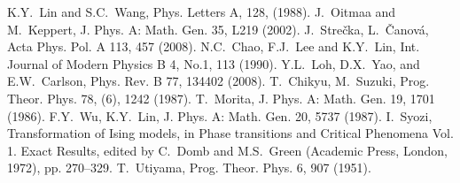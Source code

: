 \documentclass[utf8,12pt]{jetp}
\begin{document}
\begin{references}
 K.Y.~Lin and S.C.~Wang, Phys. Letters A, 128, (1988).
 J.~Oitmaa and M.~Keppert, J. Phys. A: Math. Gen. 35, L219 (2002).
 J.~Strečka, L.~Čanová, Acta Phys. Pol. A 113, 457 (2008). 
 N.C.~Chao, F.J.~Lee and K.Y.~Lin, Int. Journal of Modern Physics B 4, No.1, 113 (1990).
 Y.L.~Loh, D.X.~Yao, and E.W.~Carlson, Phys. Rev. B 77, 134402 (2008).
 T.~Chikyu, M.~Suzuki, Prog. Theor. Phys. 78, (6), 1242 (1987).
 T.~Morita, J. Phys. A: Math. Gen. 19, 1701 (1986).
 F.Y.~Wu, K.Y.~Lin, J. Phys. A: Math. Gen. 20, 5737 (1987).
 I.~Syozi, Transformation of Ising models, in Phase transitions and Critical Phenomena Vol. 1. Exact Results, edited by C.~Domb and M.S.~Green (Academic Press, London, 1972), pp. 270–329.
 T.~Utiyama, Prog. Theor. Phys. 6, 907 (1951).



\end{references}
	
\end{document}
